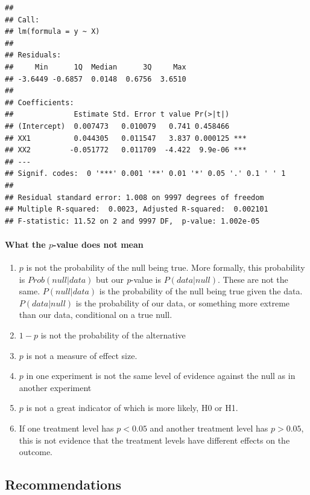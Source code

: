 \documentclass[]{book}
\providecommand{\tightlist}{%
  \setlength{\itemsep}{0pt}\setlength{\parskip}{0pt}}
\let\oldparagraph\paragraph
\renewcommand{\paragraph}[1]{\oldparagraph{#1}\mbox{}}
\begin{document}
\begin{verbatim}
## 
## Call:
## lm(formula = y ~ X)
## 
## Residuals:
##     Min      1Q  Median      3Q     Max 
## -3.6449 -0.6857  0.0148  0.6756  3.6510 
## 
## Coefficients:
##              Estimate Std. Error t value Pr(>|t|)    
## (Intercept)  0.007473   0.010079   0.741 0.458466    
## XX1          0.044305   0.011547   3.837 0.000125 ***
## XX2         -0.051772   0.011709  -4.422  9.9e-06 ***
## ---
## Signif. codes:  0 '***' 0.001 '**' 0.01 '*' 0.05 '.' 0.1 ' ' 1
## 
## Residual standard error: 1.008 on 9997 degrees of freedom
## Multiple R-squared:  0.0023, Adjusted R-squared:  0.002101 
## F-statistic: 11.52 on 2 and 9997 DF,  p-value: 1.002e-05
\end{verbatim}

\hypertarget{what-the-p-value-does-not-mean}{%
\paragraph{\texorpdfstring{What the \(p\)-value does not mean}{What the p-value does not mean}}\label{what-the-p-value-does-not-mean}}

\begin{enumerate}
\def\labelenumi{\arabic{enumi}.}
\tightlist
\item
  \(p\) is not the probability of the null being true. More formally, this probability is \(Prob(null | data)\) but our \emph{p}-value is \(P(data | null)\). These are not the same. \(P(null | data)\) is the probability of the null being true given the data. \(P(data | null)\) is the probability of our data, or something more extreme than our data, conditional on a true null.
\item
  \(1-p\) is not the probability of the alternative
\item
  \(p\) is not a measure of effect size.
\item
  \(p\) in one experiment is not the same level of evidence against the null as in another experiment
\item
  \(p\) is not a great indicator of which is more likely, H0 or H1.
\item
  If one treatment level has \(p < 0.05\) and another treatment level has \(p > 0.05\), this is not evidence that the treatment levels have different effects on the outcome.
\end{enumerate}

\hypertarget{recommendations}{%
\subsection{Recommendations}\label{recommendations}}
\end{document}
